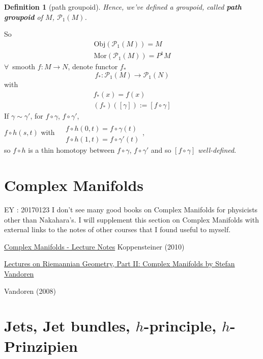 \documentclass[10pt]{amsart}
\newtheorem{definition}{Definition}
\begin{document}
\begin{multicols*}{2}
\begin{definition}[path groupoid]
	Hence, we've defined a groupoid, called \textbf{path groupoid} of $M$, $\mathcal{P}_1(M)$. 
\end{definition}

So 
\[
\begin{gathered}
\text{Obj}(\mathcal{P}_1(M)) = M \\
\text{Mor}(\mathcal{P}_1(M)) = P^1M
\end{gathered}
\]
$\forall \, $ smooth $f:M \to N$, denote functor $f_*$
\begin{equation}
f_* : \mathcal{P}_1(M) \to \mathcal{P}_1(N)
\end{equation}
with 
\[
\begin{gathered}
f_*(x) = f(x) \\
(f_*)([\gamma]) := [f\circ \gamma]
\end{gathered}
\]
If $\gamma \sim \gamma'$, for $f\circ \gamma$, $f\circ \gamma'$, \\
$f\circ h(s,t) $ with $\begin{aligned} & \quad \\ 
& f\circ h(0,t) = f\circ \gamma(t) \\
& f\circ h(1,t) = f\circ \gamma'(t) \end{aligned}$, \\
so $f\circ h$ is a thin homotopy between $f\circ \gamma$, $f\circ \gamma'$ and so $[f\circ \gamma]$ \emph{well-defined}.




\part{Complex Manifolds}

EY : 20170123 I don't see many good books on Complex Manifolds for physicists other than Nakahara's.  I will supplement this section on Complex Manifolds with external links to the notes of other courses that I found useful to myself.


\href{http://www.caramdir.at/uploads/math/piii-cm/complex-manifolds.pdf}{Complex Manifolds - Lecture Notes}
Koppensteiner (2010) \cite{Kopp2010}


\href{http://www.staff.science.uu.nl/~vando101/MRIlectures.pdf}{Lectures on Riemannian Geometry, Part II: Complex Manifolds by Stefan Vandoren}

Vandoren (2008) \cite{Vand2008}

\part{Jets, Jet bundles, $h$-principle, $h$-Prinzipien}


\end{multicols*}
\end{document}
